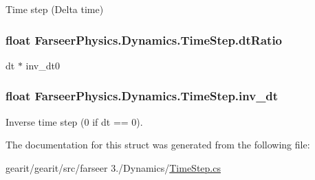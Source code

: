 Time step (Delta time) 

\hypertarget{struct_farseer_physics_1_1_dynamics_1_1_time_step_a57f084fc9f6903f887c6c825acf487f0}{
\subsubsection[{dt\+Ratio}]{\setlength{\rightskip}{0pt plus 5cm}float Farseer\+Physics.\+Dynamics.\+Time\+Step.\+dt\+Ratio}}\label{struct_farseer_physics_1_1_dynamics_1_1_time_step_a57f084fc9f6903f887c6c825acf487f0}


dt $\ast$ inv\+\_\+dt0 

\hypertarget{struct_farseer_physics_1_1_dynamics_1_1_time_step_a38654fdd48ccb57419339600eac4fe64}{
\subsubsection[{inv\+\_\+dt}]{\setlength{\rightskip}{0pt plus 5cm}float Farseer\+Physics.\+Dynamics.\+Time\+Step.\+inv\+\_\+dt}}\label{struct_farseer_physics_1_1_dynamics_1_1_time_step_a38654fdd48ccb57419339600eac4fe64}


Inverse time step (0 if dt == 0). 



The documentation for this struct was generated from the following file\+:\begin{DoxyCompactItemize}
\item 
gearit/gearit/src/farseer 3./\+Dynamics/\hyperlink{_time_step_8cs}{Time\+Step.\+cs}\end{DoxyCompactItemize}
